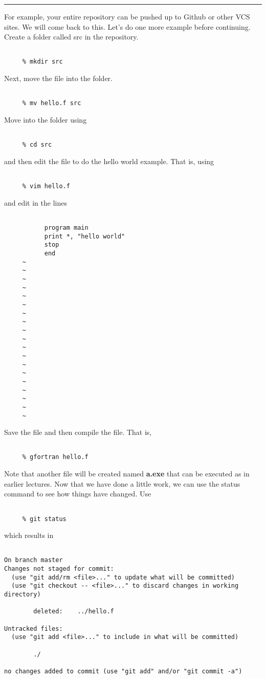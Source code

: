 \documentclass[10pt,fleqn]{article}
\begin{document}
\vskip0.1in\hrule\vskip0.1in
\noindent
For example, your entire repository can be pushed up to Github or other VCS
sites. We will come back to this. Let's do one more example before continuing.
Create a folder called src in the repository.
\begin{verbatim}

     % mkdir src

\end{verbatim}
Next, move the file into the folder.
\begin{verbatim}

     % mv hello.f src

\end{verbatim}
Move into the folder using
\begin{verbatim}

     % cd src

\end{verbatim}
and then edit the file to do the hello world example. That is, using
\begin{verbatim}

     % vim hello.f

\end{verbatim}
and edit in the lines
\begin{verbatim}

           program main
           print *, "hello world"
           stop
           end
     ~
     ~
     ~
     ~
     ~
     ~
     ~
     ~
     ~
     ~
     ~
     ~
     ~
     ~
     ~
     ~
     ~
     ~
     ~

\end{verbatim}
Save the file and then compile the file. That is,
\begin{verbatim}

     % gfortran hello.f

\end{verbatim}
Note that another file will be created named {\bf a.exe} that can be executed
as in earlier lectures. Now that we have done a little work, we can use the
status command to see how things have changed. Use
\begin{verbatim}

     % git status

\end{verbatim}
which results in
\begin{verbatim}

On branch master
Changes not staged for commit:
  (use "git add/rm <file>..." to update what will be committed)
  (use "git checkout -- <file>..." to discard changes in working directory)

        deleted:    ../hello.f

Untracked files:
  (use "git add <file>..." to include in what will be committed)

        ./

no changes added to commit (use "git add" and/or "git commit -a")

\end{verbatim}
\end{document}
